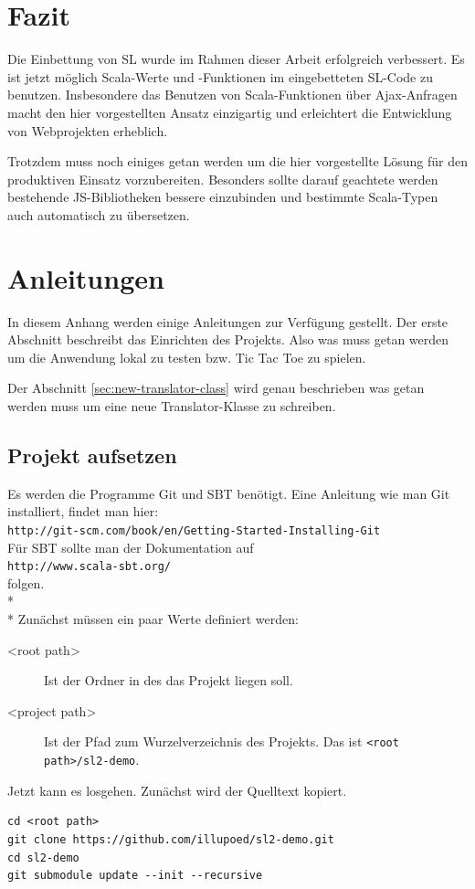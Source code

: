 \documentclass[12pt,bibtotoc]{scrreprt}
\begin{document}
\chapter{Fazit}
\label{chap:conclusion}

Die Einbettung von SL wurde im Rahmen dieser Arbeit erfolgreich verbessert. Es ist jetzt möglich Scala-Werte und -Funktionen im eingebetteten SL-Code zu benutzen. Insbesondere das Benutzen von Scala-Funktionen über Ajax-Anfragen macht den hier vorgestellten Ansatz einzigartig und erleichtert die Entwicklung von Webprojekten erheblich.

Trotzdem muss noch einiges getan werden um die hier vorgestellte Lösung für den produktiven Einsatz vorzubereiten. Besonders sollte darauf geachtete werden bestehende JS-Bibliotheken bessere einzubinden und bestimmte Scala-Typen auch automatisch zu übersetzen.


\appendix

\chapter{Anleitungen}

In diesem Anhang werden einige Anleitungen zur Verfügung gestellt. Der erste Abschnitt beschreibt das Einrichten des Projekts. Also was muss getan werden um die Anwendung lokal zu testen bzw. Tic Tac Toe zu spielen.

Der Abschnitt \ref{sec:new-translator-class} wird genau beschrieben was getan werden muss um eine neue Translator-Klasse zu schreiben. 

\section{Projekt aufsetzen}
\label{sec:setup-project}

Es werden die Programme Git und SBT benötigt. Eine Anleitung wie man Git installiert, findet man hier:\\\lstinline!http://git-scm.com/book/en/Getting-Started-Installing-Git!\\
Für SBT sollte man der Dokumentation auf\\
\lstinline!http://www.scala-sbt.org/!\\
folgen.\\*
\\*
Zunächst müssen ein paar Werte definiert werden:
\begin{description}
 \item[<root path>] Ist der Ordner in des das Projekt liegen soll.
 \item[<project path>] Ist der Pfad zum Wurzelverzeichnis des Projekts. Das ist \lstinline!<root path>/sl2-demo!.
\end{description}
Jetzt kann es losgehen. Zunächst wird der Quelltext kopiert.
\begin{lstlisting}
cd <root path>
git clone https://github.com/illupoed/sl2-demo.git
cd sl2-demo
git submodule update --init --recursive
\end{lstlisting}
\end{document}
